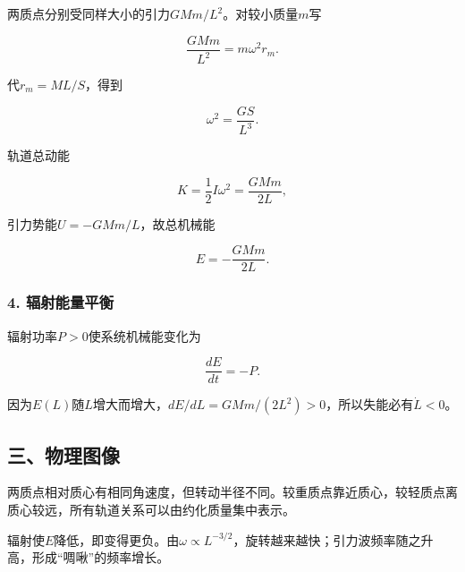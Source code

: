 \documentclass[12pt,a4paper,fontset=fandol]{ctexart}
\begin{document}
两质点分别受同样大小的引力\(GMm/L^2\)。对较小质量\(m\)写

\[
\frac{GMm}{L^2}=m\omega^2r_m.
\]

代\(r_m=ML/S\)，得到

\[
\boxed{\omega^2=\frac{GS}{L^3}}.
\]

轨道总动能

\[
K=\frac12I\omega^2=\frac{GMm}{2L},
\]

引力势能\(U=-GMm/L\)，故总机械能

\[
\boxed{E=-\frac{GMm}{2L}}.
\]

\subsubsection{4.
辐射能量平衡}\label{ux8f90ux5c04ux80fdux91cfux5e73ux8861}

辐射功率\(P>0\)使系统机械能变化为

\[
\frac{dE}{dt}=-P.
\]

因为\(E(L)\)随\(L\)增大而增大，\(dE/dL=GMm/(2L^2)>0\)，所以失能必有\(\dot L<0\)。

\subsection{三、物理图像}\label{ux4e09ux7269ux7406ux56feux50cf-6}

两质点相对质心有相同角速度，但转动半径不同。较重质点靠近质心，较轻质点离质心较远，所有轨道关系可以由约化质量集中表示。

辐射使\(E\)降低，即变得更负。由\(\omega\propto L^{-3/2}\)，旋转越来越快；引力波频率随之升高，形成``啁啾''的频率增长。

\begin{center}
\begin{minipage}{\linewidth}
\centering\begingroup{}
\ifdim\wd\diagrambox>.88\linewidth
\sbox{\diagrambox}{\resizebox{.88\linewidth}{!}{\usebox{\diagrambox}}}\fi
\ifdim\ht\diagrambox>.38\textheight
\resizebox{!}{.38\textheight}{\usebox{\diagrambox}}
\else\usebox{\diagrambox}\fi
\par{}\endgroup\end{minipage}\end{center}
\end{document}
